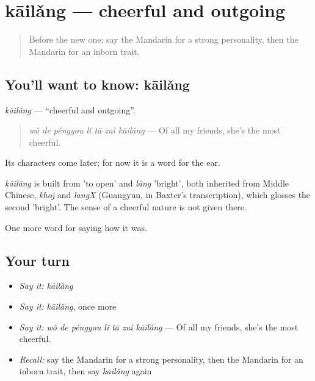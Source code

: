 \section[kāilǎng]{kāilǎng — cheerful and outgoing}

\label{lesson:ZH-C467-kailang}



\begin{quote}
Before the new one: say the Mandarin for a strong personality, then the Mandarin for an inborn trait.
\end{quote}

\subsection*{You'll want to know: kāilǎng}
\emph{kāilǎng} — \textquotedblleft{}cheerful and outgoing\textquotedblright{}.

\begin{quote}
\emph{wǒ de péngyou lǐ tā zuì kāilǎng} — Of all my friends, she's the most cheerful.
\end{quote}

Its characters come later; for now it is a word for the ear.

\begin{cousinweb}
\emph{kāilǎng} is built from  'to open' and \emph{lǎng} 'bright', both inherited from Middle Chinese, \emph{khoj} and \emph{langX} (Guangyun, in Baxter's transcription), which glosses the second 'bright'. The sense of a cheerful nature is not given there.
\end{cousinweb}

\begin{grammarlens}[title={What you've built}]
One more word for saying how it was.
\end{grammarlens}

\subsection*{Your turn}
\begin{itemize}
\raggedright
  \item \emph{Say it:} \emph{kāilǎng}
  \item \emph{Say it:} \emph{kāilǎng}, once more
  \item \emph{Say it:} \emph{wǒ de péngyou lǐ tā zuì kāilǎng} — Of all my friends, she's the most cheerful.
  \item \emph{Recall:} say the Mandarin for a strong personality, then the Mandarin for an inborn trait, then say \emph{kāilǎng} again
\end{itemize}

